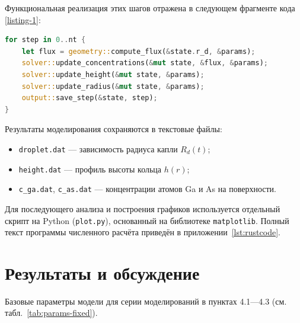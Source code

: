 \documentclass[14pt,oneside]{extarticle}
\begin{document}
Функциональная реализация этих шагов отражена в следующем фрагменте кода \ref{listing-1}:

\begin{lstlisting}[language=Rust, caption={Основной цикл численного расчёта\label{listing-1}}]
for step in 0..nt {
    let flux = geometry::compute_flux(&state.r_d, &params);
    solver::update_concentrations(&mut state, &flux, &params);
    solver::update_height(&mut state, &params);
    solver::update_radius(&mut state, &params);
    output::save_step(&state, step);
}
\end{lstlisting}

Результаты моделирования сохраняются в текстовые файлы:
\begin{itemize}
    \item \texttt{droplet.dat} — зависимость радиуса капли $R_d(t)$;
    \item \texttt{height.dat} — профиль высоты кольца $h(r)$;
    \item \texttt{c\_ga.dat}, \texttt{c\_as.dat} — концентрации атомов Ga и As на поверхности.
\end{itemize}

Для последующего анализа и построения графиков используется отдельный скрипт на Python (\texttt{plot.py}), основанный на библиотеке \texttt{matplotlib}. Полный текст программы численного расчёта приведён в приложении~\ref{lst:rustcode}.

\pagebreak
\section{Результаты и обсуждение}

Базовые параметры модели для серии моделирований в пунктах 4.1—4.3 (см. табл.~\ref{tab:params-fixed}).
\end{document}
